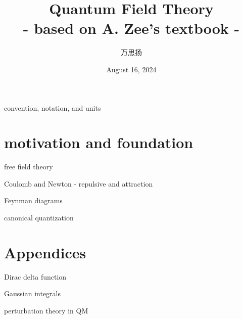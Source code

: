 \documentclass[10pt, a4paper]{report}
\title{\Huge \textbf{Quantum Field Theory} \\ \LARGE - based on A. Zee's textbook -}
\author{万思扬}
\date{August 16, 2024}
\numberwithin{equation}{section}
\begin{document}
	\maketitle
	
	\tableofcontents
	
	\pagebreak
	
	{convention, notation, and units}
	
	\part{motivation and foundation}
	
	{free field theory}
	
	{Coulomb and Newton - repulsive and attraction}
	
	{Feynman diagrams}
	
	{canonical quantization}
	
	\appendix
	
	\part*{Appendices}
	
	{Dirac delta function}
	
	{Gaussian integrals}
	
	{perturbation theory in QM}
\end{document}
